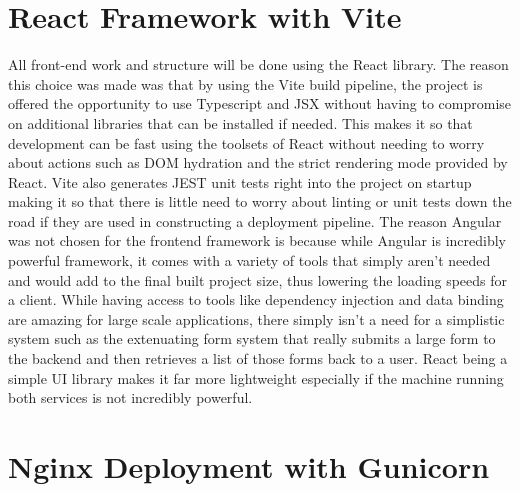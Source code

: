 \section{React Framework with Vite}

All front-end work and structure will be done using the React library. The reason this choice was made was that by using the Vite build pipeline, the project is offered the opportunity to use Typescript and JSX without having to compromise on additional libraries that can be installed if needed. This makes it so that development can be fast using the toolsets of React without needing to worry about actions such as DOM hydration and the strict rendering mode provided by React. Vite also generates JEST unit tests right into the project on startup making it so that there is little need to worry about linting or unit tests down the road if they are used in constructing a deployment pipeline.
\newline
\newline
The reason Angular was not chosen for the frontend framework is because while Angular is incredibly powerful framework, it comes with a variety of tools that simply aren't needed and would add to the final built project size, thus lowering the loading speeds for a client. While having access to tools like dependency injection and data binding are amazing for large scale applications, there simply isn't a need for a simplistic system such as the extenuating form system that really submits a large form to the backend and then retrieves a list of those forms back to a user. React being a simple UI library makes it far more lightweight especially if the machine running both services is not incredibly powerful.

\section{Nginx Deployment with Gunicorn}

